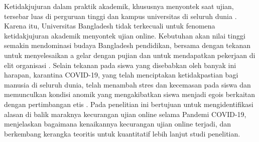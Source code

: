 Ketidakjujuran dalam praktik akademik, khususnya menyontek saat ujian, tersebar luas di perguruan tinggi dan kampus universitas di seluruh dunia \citep{chen2009relationship}. Karena itu, Universitas Bangladesh tidak terkecuali untuk fenomena ketidakjujuran akademik menyontek ujian online. Kebutuhan akan nilai tinggi semakin mendominasi budaya Bangladesh pendidikan, bersama dengan tekanan untuk menyelesaikan a gelar dengan pujian dan untuk mendapatkan pekerjaan di elit organisasi \citep{razek2014academic}. Selain tekanan pada siswa yang disebabkan oleh banyak ini harapan, karantina COVID-19, yang telah menciptakan ketidakpastian bagi manusia di seluruh dunia, telah menambah stres dan kecemasan pada siswa dan memunculkan kondisi anomik yang mengakibatkan siswa menjadi egois berkaitan dengan pertimbangan etis \citep{memon2020analysis}. Pada penelitian ini bertujuan untuk mengidentifikasi alasan di balik maraknya kecurangan ujian online selama Pandemi COVID-19, menjelaskan bagaimana kenaikannya kecurangan ujian online terjadi, dan berkembang kerangka teoritis untuk kuantitatif lebih lanjut studi penelitian.

